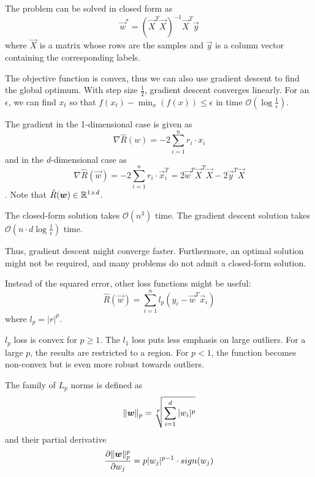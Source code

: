 The problem can be solved in closed form as
\begin{equation*}
\vec{w}^* = (\vec{X}^T \vec{X})^{-1} \vec{X}^T \vec{y}
\end{equation*}
where $\vec{X}$ is a matrix whose rows are the samples and
$\vec{y}$ is a column vector containing the corresponding labels.

The objective function is convex, thus we can also use gradient
descent to find the global optimum.
With step size $\frac{1}{2}$,
gradient descent converges linearly.
For an $\epsilon$, we can find $x_t$ so that
$f(x_t) - \min_x(f(x)) \leq \epsilon$ in time
$\mathcal{O}(\log \frac{1}{\epsilon})$.

The gradient in the 1-dimensional case is given as
\begin{equation*}
\nabla \hat{R}(w)
= -2 \sum_{i = 1}^n{r_i \cdot x_i}
\end{equation*}
and in the $d$-dimensional case as
\begin{equation*}
\nabla \hat{R}(\vec{w})
= -2 \sum_{i = 1}^n{r_i \cdot \vec{x}_i^T}
= 2 \vec{w}^T \vec{X}^T \vec{X} - 2 \vec{y}^T \vec{X}
\end{equation*}.
Note that $\hat{R}(\boldsymbol{w}) \in \mathbb{R}^{1 \times d}$.

The closed-form solution takes $\mathcal{O}(n^3)$ time.
The gradient descent solution takes
$\mathcal{O}(n \cdot d \log \frac{1}{\epsilon})$ time.

Thus, gradient descent might converge faster.
Furthermore, an optimal solution might not be required,
and many problems do not admit a closed-form solution.

Instead of the squared error, other loss functions might be useful:
\begin{equation*}
\hat{R}(\vec{w}) = \sum_{i = 1}^n{l_p(y_i - \vec{w}^T \vec{x}_i)}
\end{equation*}
where $l_p = |r|^p$.

$l_p$ loss is convex for $p \geq 1$.
The $l_1$ loss puts less emphasis on large outliers.
For a large $p$, the results are restricted to a region.
For $p < 1$, the function becomes non-convex but is even more
robust towards outliers.

The family of $L_p$ norms is defined as
\begin{equation*}
\lVert\boldsymbol{w}\rVert_p =
\sqrt[p]{\sum_{i=1}^d{|w_i|^p}}
\end{equation*}
and their partial derivative
\begin{equation*}
\frac{\partial \lVert\boldsymbol{w}\rVert_p^p}{\partial w_j}
= p |w_j|^{p-1} \cdot sign(w_j)
\end{equation*}


